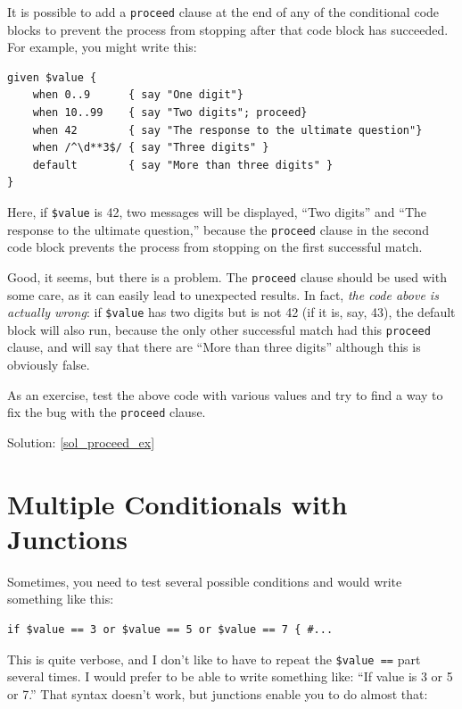 It is possible to add a {\tt proceed} clause at the end of 
any of the conditional code blocks to prevent the process 
from stopping after that code block has succeeded. For example, 
you might write this:

\begin{verbatim}
given $value {
    when 0..9      { say "One digit"}
    when 10..99    { say "Two digits"; proceed}
    when 42        { say "The response to the ultimate question"}
    when /^\d**3$/ { say "Three digits" }
    default        { say "More than three digits" }
}
\end{verbatim}

Here, if \verb'$value' is 42, two messages will be displayed,  
``Two digits'' and ``The response to the ultimate question,'' 
because the {\tt proceed} clause in the second code block 
prevents the process from stopping on the first successful match.

Good, it seems, but there is a problem. The {\tt proceed} clause 
should be used with some care, as it can easily lead 
to unexpected results. In fact, \emph{the code above 
is actually wrong}: if \verb'$value' has two digits but is 
not 42 (if it is, say, 43), the default block will also run, 
because the only other successful match had this {\tt proceed} 
clause, and will say that there are ``More than three digits'' 
although this is obviously false. 

\label{proceed_ex}
As an exercise, test the above code with various values and 
try to find a way to fix the bug with the {\tt proceed} 
clause.

Solution: \ref{sol_proceed_ex}

\section{Multiple Conditionals with Junctions}
\label{junction}

Sometimes, you need to test several possible conditions 
and would write something like this:

\begin{verbatim}
if $value == 3 or $value == 5 or $value == 7 { #...
\end{verbatim}

This is quite verbose, and I don't like to have to 
repeat the \verb'$value ==' part several times. I 
would prefer to be able to write something like: 
``If value is 3 or 5 or 7.'' That syntax doesn't work, 
but junctions enable you to do almost that:

